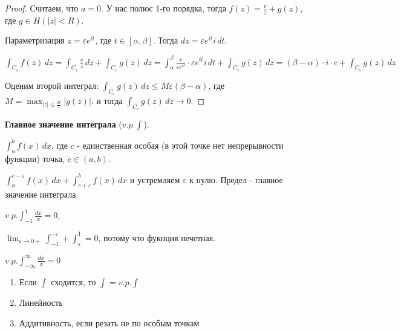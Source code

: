 \begin{proof}
    Считаем, что $a = 0$. У нас полюс 1-го порядка, тогда $f(z) = \frac{c}{z} + g(z)$, где $g \in H(|z| < R)$.

    Параметризация $z = \varepsilon e^{it}$, где $t \in [\alpha, \beta]$. Тогда $dz = \varepsilon e^{it} i \, dt$.

    $\int_{C_{\varepsilon}} f(z) \, dz = \int_{C_{\varepsilon}} \frac{c}{z} \, dz + \int_{C_{\varepsilon}} g(z) \, dz = 
    \int_{\alpha}^{\beta} \frac{c}{\varepsilon e^{it}} \cdot \varepsilon e^{it} i \, dt + \int_{C_{\varepsilon}} g(z) \, dz = (\beta - \alpha) \cdot i \cdot c + \int_{C_{\varepsilon}} g(z) \, dz$

    Оценим второй интеграл: $\int_{C_{\varepsilon}} g(z) \, dz \leqslant M \varepsilon (\beta - \alpha)$, где $M = \max_{|z| \leqslant \frac{R}{2}} |g(z)|$. и
    тогда $\int_{C_{\varepsilon}} g(z) \, dz \rightarrow 0$.
\end{proof}

\begin{definition}
    \textbf{Главное значение интеграла} ($v.p. \int$).

    $\int_{a}^{b} f(x) \, dx$, где $c$ - единственная особая (в этой точке нет непрерывности функции) точка, $c \in (a, b)$. 

    $\int_{a}^{c - \varepsilon} f(x) \, dx + \int_{c + \varepsilon}^{b} f(x) \, dx$ 
    и устремляем $\varepsilon$ к нулю. Предел - главное значение интеграла.
\end{definition}

\begin{example}
    $v.p. \int_{-1}^{1} \frac{dx}{x} = 0$. 

    $\lim_{\varepsilon \rightarrow 0+} \int_{-1}^{-\varepsilon} + \int_{\varepsilon}^{1} = 0$, потому что
    фукнция нечетная.

    $v.p. \int_{-\infty}^{\infty} \frac{dx}{x} = 0$
\end{example}

\begin{properties}
    \begin{enumerate}
        \item {
            Если $\int$ сходится, то $\int = v.p. \int$
        }
        \item {
            Линейность 
        }
        \item {
            Аддитивность, если резать не по особым точкам
        }
    \end{enumerate}
\end{properties}


